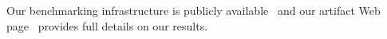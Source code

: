 Our benchmarking infrastructure is publicly available~\cite{mubench} and our artifact Web page~\cite{artifact-page} provides full details on our results.




